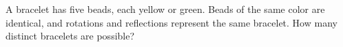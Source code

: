 A bracelet has five beads, each yellow or green. Beads of the same color are identical, and rotations and reflections represent the same bracelet. How many distinct bracelets are possible?

